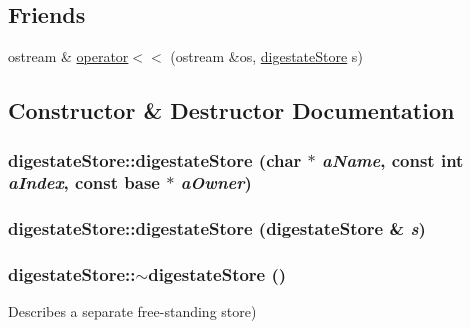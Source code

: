 \subsection*{Friends}
\begin{DoxyCompactItemize}
\item 
ostream \& \hyperlink{classdigestate_store_afe43a1f833661ff0491a2b3f4a2a0c24}{operator$<$$<$} (ostream \&os, \hyperlink{classdigestate_store}{digestateStore} s)
\end{DoxyCompactItemize}


\subsection{Constructor \& Destructor Documentation}
\hypertarget{classdigestate_store_ac64748835b5217088a548eac36df37b9}{
\subsubsection[{digestateStore}]{\setlength{\rightskip}{0pt plus 5cm}digestateStore::digestateStore (char $\ast$ {\em aName}, \/  const int {\em aIndex}, \/  const {\bf base} $\ast$ {\em aOwner})}}
\label{classdigestate_store_ac64748835b5217088a548eac36df37b9}
\hypertarget{classdigestate_store_ae72cb0da7e28d9b0c9c46cfca42cc7fd}{
\subsubsection[{digestateStore}]{\setlength{\rightskip}{0pt plus 5cm}digestateStore::digestateStore ({\bf digestateStore} \& {\em s})}}
\label{classdigestate_store_ae72cb0da7e28d9b0c9c46cfca42cc7fd}
\hypertarget{classdigestate_store_a61a67d4df48d66416fbabb1941075329}{
\subsubsection[{$\sim$digestateStore}]{\setlength{\rightskip}{0pt plus 5cm}digestateStore::$\sim$digestateStore ()}}
\label{classdigestate_store_a61a67d4df48d66416fbabb1941075329}
Describes a separate free-\/standing store) 

